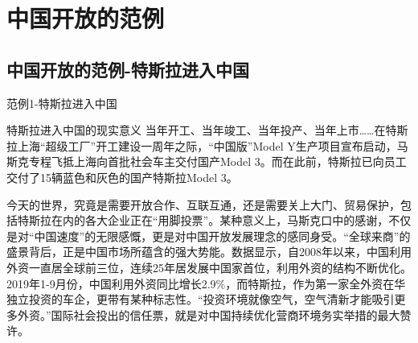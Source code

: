 \documentclass[10pt,aspectratio=169,english,fontset=none]{beamer}
\begin{document}
\section{中国开放的范例}
\subsection{中国开放的范例-特斯拉进入中国}
\begin{frame}[fragile]{范例1-特斯拉进入中国}
\pause[1]\begin{alertblock}{特斯拉进入中国的现实意义}
    当年开工、当年竣工、当年投产、当年上市……在特斯拉上海“超级工厂”开工建设一周年之际，“中国版”Model Y生产项目宣布启动，马斯克专程飞抵上海向首批社会车主交付国产Model 3。而在此前，特斯拉已向员工交付了15辆蓝色和灰色的国产特斯拉Model 3。

    今天的世界，究竟是需要开放合作、互联互通，还是需要关上大门、贸易保护，包括特斯拉在内的各大企业正在“用脚投票”。某种意义上，马斯克口中的感谢，不仅是对“中国速度”的无限感慨，更是对中国开放发展理念的感同身受。“全球来商”的盛景背后，正是中国市场所蕴含的强大势能。数据显示，自2008年以来，中国利用外资一直居全球前三位，连续25年居发展中国家首位，利用外资的结构不断优化。2019年1-9月份，中国利用外资同比增长2.9\%，而特斯拉，作为第一家全外资在华独立投资的车企，更带有某种标志性。“投资环境就像空气，空气清新才能吸引更多外资。”国际社会投出的信任票，就是对中国持续优化营商环境务实举措的最大赞许。
\end{alertblock}

\end{frame}
\end{document}
